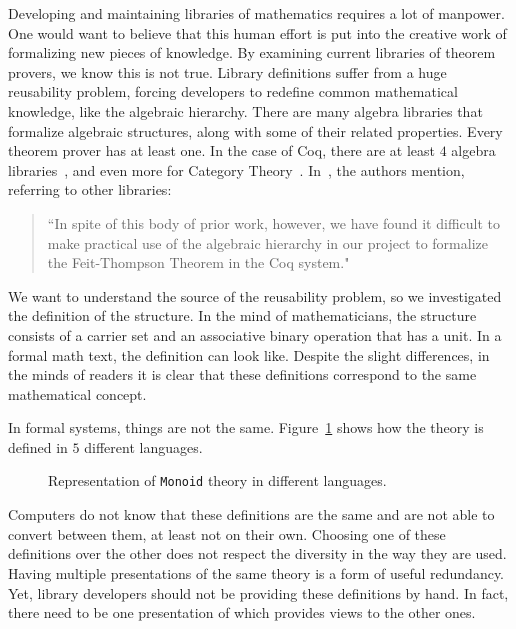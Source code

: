 Developing and maintaining libraries of mathematics requires a lot of manpower. One would want to believe that this human effort is put into the creative work of formalizing new pieces of knowledge. By examining current libraries of theorem provers, we know this is not true. Library definitions suffer from a huge reusability problem, forcing developers to redefine common mathematical knowledge, like the algebraic hierarchy. There are many algebra libraries that formalize algebraic structures, along with some of their related properties. Every theorem prover has at least one. In the case of Coq, there are at least $4$ algebra libraries~\cite{Gonthier2009,Geuvers2002,coq-contribs-algebra,Spitters2010}, and even more for Category Theory~\cite{spivak2014coqcats}. 
In~\cite{Gonthier2009}, the authors mention, referring to other libraries:  
\begin{quote}
    ``In spite of this body of prior work, however, we have found it
    difficult to make practical use of the algebraic hierarchy in our project to
    formalize the Feit-Thompson Theorem in the Coq system."
\end{quote}
We want to understand the source of the reusability problem, so we investigated the definition of the  structure. In the mind of mathematicians, the  structure consists of a carrier set and an associative binary operation that has a unit. In a formal math text, the definition can look like. Despite the slight differences, in the minds of readers it is clear that these definitions correspond to the same mathematical concept. 

In formal systems, things are not the same. Figure~\ref{fig:mon-diff-lang} shows how the  theory is defined in $5$ different languages.
\begin{figure}
    
    \caption{Representation of \lstinline|Monoid| theory in different languages.}
    \label{fig:mon-diff-lang}
\end{figure}
Computers do not know that these definitions are the same and are not able to convert between them, at least not on their own. Choosing one of these definitions over the other does not respect the diversity in the way they are used. Having multiple presentations of the same theory is a form of useful redundancy. Yet, library developers should not be providing these definitions by hand. In fact, there need to be one presentation of  which provides views to the other ones. 

